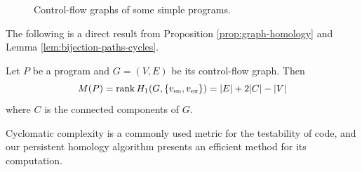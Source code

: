 \begin{figure}
    \caption{Control-flow graphs of some simple programs.}
    \label{fig:control-flow-identified-ex}
\end{figure}

The following is a direct result from Proposition \ref{prop:graph-homology} and Lemma \ref{lem:bijection-paths-cycles}.

\begin{corollary}
    Let $P$ be a program and $G = (V,E)$ be its control-flow graph. Then
    \[ M(P) = \operatorname{rank} H_1(G, \{v_{\text{en}}, v_{\text{ex}}\}) = \lvert E \rvert + 2\lvert C \rvert - \lvert V \rvert \]
    where $C$ is the connected components of $G$.
\end{corollary}

Cyclomatic complexity is a commonly used metric for the testability of code, and our persistent homology algorithm presents an efficient method for its computation. 
